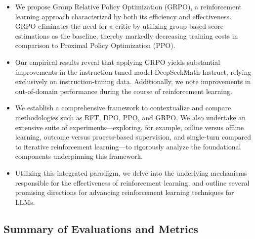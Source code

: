 \begin{itemize}[topsep=0pt]
    \item We propose Group Relative Policy Optimization (GRPO), a reinforcement learning approach characterized by both its efficiency and effectiveness. GRPO eliminates the need for a critic by utilizing group-based score estimations as the baseline, thereby markedly decreasing training costs in comparison to Proximal Policy Optimization (PPO).
    \item Our empirical results reveal that applying GRPO yields substantial improvements in the instruction-tuned model DeepSeekMath-Instruct, relying exclusively on instruction-tuning data. Additionally, we note improvements in out-of-domain performance during the course of reinforcement learning.
    \item We establish a comprehensive framework to contextualize and compare methodologies such as RFT, DPO, PPO, and GRPO. We also undertake an extensive suite of experiments—exploring, for example, online versus offline learning, outcome versus process-based supervision, and single-turn compared to iterative reinforcement learning—to rigorously analyze the foundational components underpinning this framework.
    \item Utilizing this integrated paradigm, we delve into the underlying mechanisms responsible for the effectiveness of reinforcement learning, and outline several promising directions for advancing reinforcement learning techniques for LLMs.
\end{itemize}

\subsection{Summary of Evaluations and Metrics}

